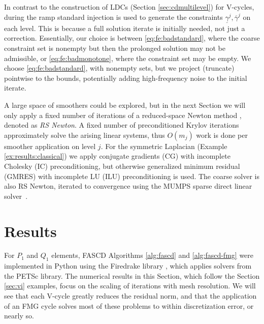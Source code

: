 \documentclass[review,hidelinks,onefignum,onetabnum,final]{siamart220329}  %
\begin{document}
In contrast to the construction of LDCs (Section \ref{sec:cdmultilevel}) for V-cycles, during the ramp standard injection is used to generate the constraints $\underline{\gamma}^j,\overline{\gamma}^j$ on each level.  This is because a full solution iterate is initially needed, not just a correction.  Essentially, our choice is between \eqref{eq:fe:badstandard}, where the coarse constraint set is nonempty but then the prolonged solution may not be admissible, or \eqref{eq:fe:badmonotone}, where the constraint set may be empty.  We choose \eqref{eq:fe:badstandard}, with nonempty sets, but we project (truncate) pointwise to the bounds, potentially adding high-frequency noise to the initial iterate.

A large space of smoothers could be explored, but in the next Section we will only apply a fixed number of iterations of a reduced-space Newton method \cite{Balayetal2023,BensonMunson2006}, denoted as \emph{RS Newton}.  A fixed number of preconditioned Krylov iterations \cite{Bueler2021} approximately solve the arising linear systems, thus $O(m_j)$ work is done per smoother application on level $j$.  For the symmetric Laplacian (Example \ref{ex:results:classical}) we apply conjugate gradients (CG) with incomplete Cholesky (IC) preconditioning, but otherwise generalized minimum residual (GMRES) with incomplete LU (ILU) preconditioning is used.  The coarse solver is also RS Newton, iterated to convergence using the MUMPS sparse direct linear solver~\cite{Amestoy2001}.


\section{Results} \label{sec:results}

For $P_1$ and $Q_1$ elements, FASCD Algorithms \ref{alg:fascd} and \ref{alg:fascd-fmg} were implemented in Python using the Firedrake library \cite{Rathgeberetal2016}, which applies solvers from the PETSc \cite{Balayetal2023} library.  The numerical results in this Section, which follow the Section \ref{sec:vi} examples, focus on the scaling of iterations with mesh resolution.  We will see that each V-cycle greatly reduces the residual norm, and that the application of an FMG cycle solves most of these problems to within discretization error, or nearly so.
\end{document}

